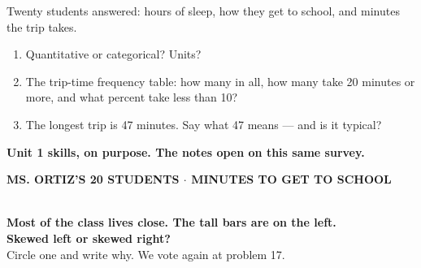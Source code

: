 \documentclass[aspectratio=169, 11pt]{beamer}
\begin{document}
\begin{frame}[t, plain]
  \vspace{0.2cm}
  \begin{center}
    \begin{minipage}{0.88\textwidth}
      Twenty students answered: hours of sleep, how they get to school, and minutes the trip takes.
      \begin{enumerate}\setlength{\itemsep}{7pt}
        \item Quantitative or categorical? Units?
        \item The trip-time frequency table: how many in all, how many take 20 minutes or more,
              and what percent take less than 10?
        \item The longest trip is 47 minutes. Say what 47 means --- and is it typical?
      \end{enumerate}
    \end{minipage}
  \end{center}
  \vspace{0.3cm}
  \begin{center}
    {\color{cerulean}\bfseries Unit 1 skills, on purpose. The notes open on this same survey.}
  \end{center}
\end{frame}

{
\begin{frame}[plain]
  \vspace{0.6cm}
  \begin{center}
    {\color{frostmid}\bfseries\small MS. ORTIZ'S 20 STUDENTS $\cdot$ MINUTES TO GET TO SCHOOL}\\[0.4cm]
    \\[0.5cm]
    {\color{white}\bfseries\Large Most of the class lives close. The tall bars are on the left.}\\[0.5cm]
    {\color{goldacc}\bfseries\large Skewed left or skewed right?}\\[0.3cm]
    {\color{frostmid}\small Circle one and write why. We vote again at problem 17.}
  \end{center}
\end{frame}
}
\end{document}

